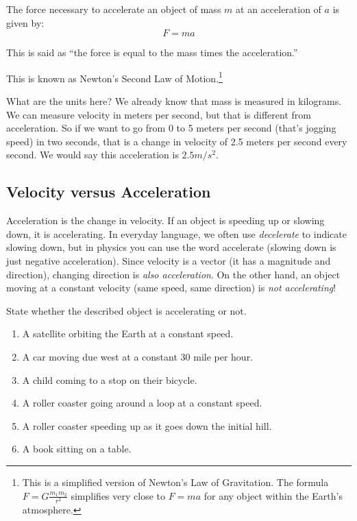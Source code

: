 \begin{mdframed}[style=important, frametitle={Newton's Second Law of Motion}]

The force necessary to accelerate an object of mass $m$ at an acceleration of
$a$ is given by:
$$F = m a$$

This is said as ``the force is equal to the mass times the acceleration.''

\end{mdframed}

This is known as Newton's Second Law of Motion.\footnote{This is a simplified version of Newton's Law of Gravitation. The formula $F = G\frac{m_1 m_2}{r^2}$ simplifies very close to $F=ma$ for any object within the Earth's atmosphere.} 

What are the units here? We already know that mass is measured in
kilograms. We can measure velocity in meters per second, but that is
different from acceleration. So if we want to go from 0 to 5 meters per second (that's
jogging speed) in two seconds, that is a change in velocity of 2.5
meters per second every second. We would say this acceleration is $2.5
m/s^2$.

\subsection{Velocity versus Acceleration}
Acceleration is the change in velocity. If an object is speeding up or slowing 
down, it is accelerating. In everyday language, we often use \textit{decelerate} 
to indicate slowing down, but in physics you can use the word accelerate (slowing 
down is just negative acceleration). Since velocity is a vector (it has a 
magnitude and direction), changing direction is \textit{also acceleration}. On 
the other hand, an object moving at a constant velocity (same speed, same 
direction) is \textit{not accelerating}!

\begin{Exercise}[title = {Is it accelerating?}, label = accel]
State whether the described object is accelerating or not. 
\begin{enumerate}
\item A satellite orbiting the Earth at a constant speed.
\item A car moving due west at a constant 30 mile per hour.
\item A child coming to a stop on their bicycle.
\item A roller coaster going around a loop at a constant speed.
\item A roller coaster speeding up as it goes down the initial hill.
\item A book sitting on a table. 
\end{enumerate}
\end{Exercise}

